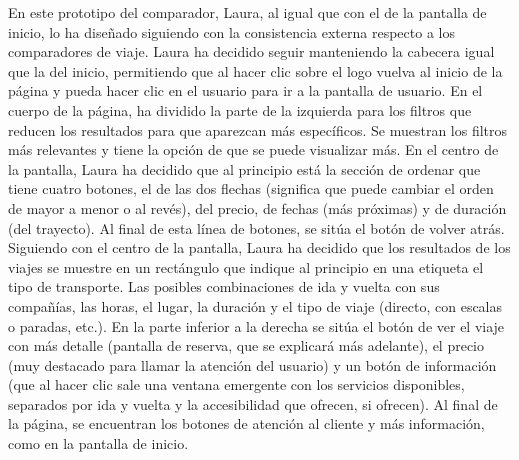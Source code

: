 \begin{itemize}
            En este prototipo del comparador, Laura, al igual que con el de la pantalla de
            inicio, lo ha diseñado siguiendo con la consistencia externa respecto a los
            comparadores de viaje. Laura ha decidido seguir manteniendo la cabecera igual
            que la del inicio, permitiendo que al hacer clic sobre el logo vuelva al inicio
            de la página y pueda hacer clic en el usuario para ir a la pantalla de usuario.
            En el cuerpo de la página, ha dividido la parte de la izquierda para los
            filtros que reducen los resultados para que aparezcan más específicos. Se
            muestran los filtros más relevantes y tiene la opción de que se puede
            visualizar más. En el centro de la pantalla, Laura ha decidido que al principio
            está la sección de ordenar que tiene cuatro botones, el de las dos flechas
            (significa que puede cambiar el orden de mayor a menor o al revés), del precio,
            de fechas (más próximas) y de duración (del trayecto). Al final de esta línea
            de botones, se sitúa el botón de volver atrás. Siguiendo con el centro de la
            pantalla, Laura ha decidido que los resultados de los viajes se muestre en un
            rectángulo que indique al principio en una etiqueta el tipo de transporte. Las
            posibles combinaciones de ida y vuelta con sus compañías, las horas, el lugar,
            la duración y el tipo de viaje (directo, con escalas o paradas, etc.). En la
            parte inferior a la derecha se sitúa el botón de ver el viaje con más detalle
            (pantalla de reserva, que se explicará más adelante), el precio (muy destacado
            para llamar la atención del usuario) y un botón de información (que al hacer
            clic sale una ventana emergente con los servicios disponibles, separados por
            ida y vuelta y la accesibilidad que ofrecen, si ofrecen). Al final de la
            página, se encuentran los botones de atención al cliente y más información,
            como en la pantalla de inicio.


\end{itemize}
